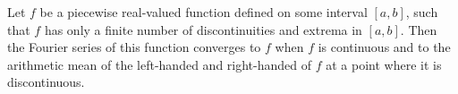 \documentclass[12pt]{article}
\begin{document}
Let $f$ be a piecewise  real-valued function defined on some interval $[a,b]$, such that $f$ has only a finite number of discontinuities and extrema in $[a,b]$. Then the Fourier series of this function converges to $f$ when $f$ is continuous and to the arithmetic mean of the left-handed and right-handed  of $f$ at a point where it is discontinuous.
\end{document}
